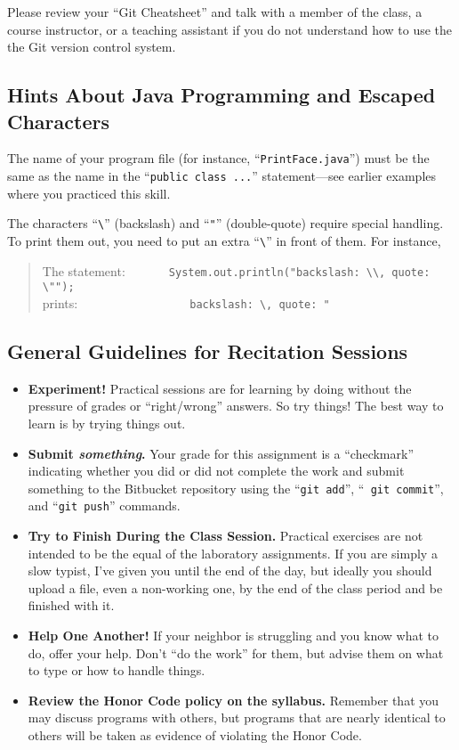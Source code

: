 Please review your ``Git Cheatsheet'' and talk with a member of the class, a course instructor, or a teaching assistant
if you do not understand how to use the the Git version control system.

\subsection*{Hints About Java Programming and Escaped Characters}

The name of your program file (for instance, ``{\tt PrintFace.java}'') must be the same as the name in the ``{\tt public
  class ...}'' statement---see earlier examples where you practiced this skill.

The characters ``\verb$\$'' (backslash) and ``\verb$"$'' (double-quote)
require special handling. To print them out, you need to put an extra
``\verb$\$'' in front of them. For instance,
\begin{quote}
The statement:\ \ \ \ \ \ \ \verb$System.out.println("backslash: \\, quote: \"");$\\
prints:\ \ \ \ \ \ \ \ \ \ \ \ \ \ \ \ \ \ 
\verb$backslash: \, quote: "$
\end{quote}

\subsection*{General Guidelines for Recitation Sessions}

\begin{itemize}

\item {\bf Experiment!} Practical sessions are for learning by doing without the pressure of grades or ``right/wrong''
  answers. So try things!  The best way to learn is by trying things out.

\item {\bf Submit \textbf{\textit{something}}.} Your grade for this assignment is a ``checkmark'' indicating whether you
  did or did not complete the work and submit something to the Bitbucket repository using the ``{\tt git add}'', ``{\tt
    git commit}'', and ``{\tt git push}'' commands.

\item {\bf Try to Finish During the Class Session.} Practical exercises are not intended to be the equal of the laboratory
  assignments. If you are simply a slow typist, I've given you until the end of the day, but ideally you should upload a
  file, even a non-working one, by the end of the class period and be finished with it.

\item
{\bf Help One Another!} 
If your neighbor is struggling and you know what
to do, offer your help. Don't ``do the work'' for them, but advise them on what
to type or how to handle things.

\item
{\bf Review the Honor Code policy on the syllabus.} Remember that you
may discuss programs with others, but programs that are nearly identical
to others will be taken as evidence of violating the Honor Code.

\end{itemize}


